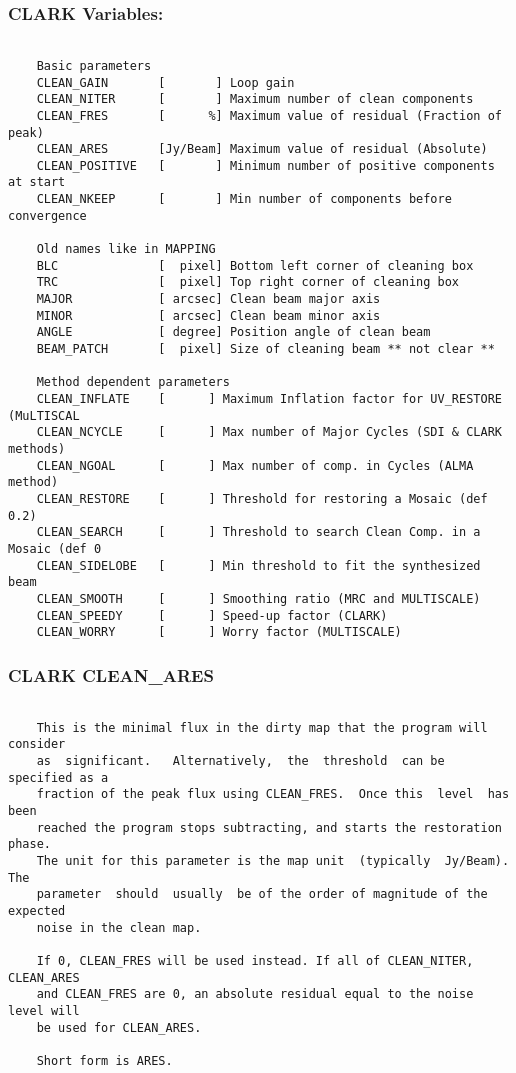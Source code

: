 \subsubsection{CLARK Variables:}
\begin{verbatim}

    Basic parameters
    CLEAN_GAIN       [       ] Loop gain
    CLEAN_NITER      [       ] Maximum number of clean components
    CLEAN_FRES       [      %] Maximum value of residual (Fraction of peak)
    CLEAN_ARES       [Jy/Beam] Maximum value of residual (Absolute)
    CLEAN_POSITIVE   [       ] Minimum number of positive components at start
    CLEAN_NKEEP      [       ] Min number of components before convergence

    Old names like in MAPPING
    BLC              [  pixel] Bottom left corner of cleaning box
    TRC              [  pixel] Top right corner of cleaning box
    MAJOR            [ arcsec] Clean beam major axis
    MINOR            [ arcsec] Clean beam minor axis
    ANGLE            [ degree] Position angle of clean beam
    BEAM_PATCH       [  pixel] Size of cleaning beam ** not clear **

    Method dependent parameters
    CLEAN_INFLATE    [      ] Maximum Inflation factor for UV_RESTORE (MuLTISCAL
    CLEAN_NCYCLE     [      ] Max number of Major Cycles (SDI & CLARK methods)
    CLEAN_NGOAL      [      ] Max number of comp. in Cycles (ALMA method)
    CLEAN_RESTORE    [      ] Threshold for restoring a Mosaic (def 0.2)
    CLEAN_SEARCH     [      ] Threshold to search Clean Comp. in a Mosaic (def 0
    CLEAN_SIDELOBE   [      ] Min threshold to fit the synthesized beam
    CLEAN_SMOOTH     [      ] Smoothing ratio (MRC and MULTISCALE)
    CLEAN_SPEEDY     [      ] Speed-up factor (CLARK)
    CLEAN_WORRY      [      ] Worry factor (MULTISCALE)
\end{verbatim}
\subsubsection{CLARK CLEAN\_ARES}
\begin{verbatim}

    This is the minimal flux in the dirty map that the program will consider
    as  significant.   Alternatively,  the  threshold  can be specified as a
    fraction of the peak flux using CLEAN_FRES.  Once this  level  has  been
    reached the program stops subtracting, and starts the restoration phase.
    The unit for this parameter is the map unit  (typically  Jy/Beam).   The
    parameter  should  usually  be of the order of magnitude of the expected
    noise in the clean map.

    If 0, CLEAN_FRES will be used instead. If all of CLEAN_NITER, CLEAN_ARES
    and CLEAN_FRES are 0, an absolute residual equal to the noise level will
    be used for CLEAN_ARES.

    Short form is ARES.

\end{verbatim}
